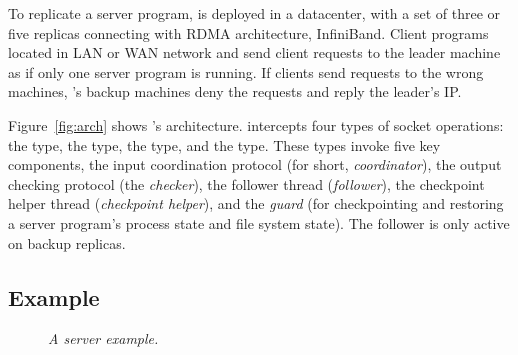 

To replicate a server program, \xxx is deployed in a datacenter, with a set of 
three or five replicas connecting with RDMA architecture, InfiniBand. Client 
programs located in LAN or WAN network and send client requests to the leader 
machine as if only one server program is running. If clients send requests to 
the wrong machines, \xxx's backup machines deny the requests and reply the 
leader's IP.

Figure~\ref{fig:arch} shows \xxx's architecture. \xxx intercepts four types of 
socket operations: the \accept type, the \recv type, the \send type, and the 
\close type. These types invoke five key components, the input coordination 
protocol (for short, \emph{coordinator}), the output checking protocol (the 
\emph{checker}), the follower thread (\emph{follower}), the checkpoint helper 
thread (\emph{checkpoint helper}), and the \emph{guard} (for checkpointing and 
restoring a server program's process state and file system state). The follower 
is only active on backup replicas.











\subsection{Example}\label{sec:example}

\begin{figure}[t]
\centering
\begin{minipage}{.5\textwidth}
\end{minipage}
\vspace{-.1in}
\caption{{\em A server example.}} \label{fig:example}
\vspace{-.20in}
\end{figure}


